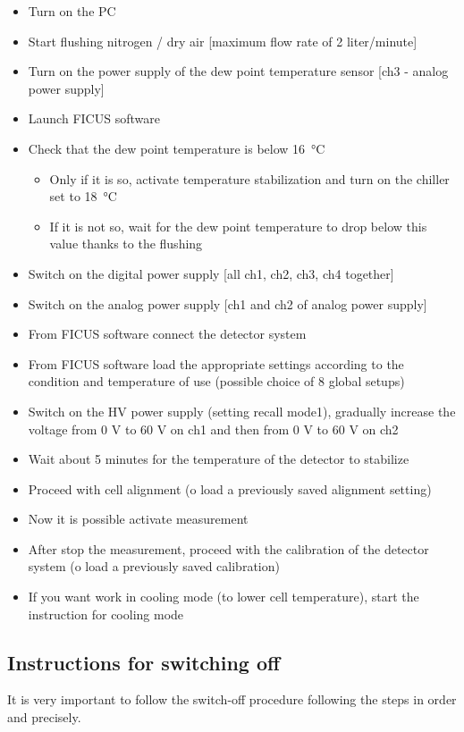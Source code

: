 \documentclass[a4paper,12pt,oneside,pdflatex,italian,final,twocolumn]{article}
\begin{document}
    \begin{itemize}
        \item Turn on the PC
        \item Start flushing nitrogen / dry air [maximum flow rate of 2 liter/minute]
        \item Turn on the power supply of the dew point temperature sensor [ch3 - analog power supply]
        \item Launch FICUS software
        \item Check that the dew point temperature is below \SI{16}{\celsius} 
            \begin{itemize}
                \item Only if it is so, activate temperature stabilization and turn on the chiller set to \SI{18}{\celsius} 
                \item If it is not so, wait for the dew point temperature to drop below this value thanks to the flushing
            \end{itemize}
        \item Switch on the digital power supply [all ch1, ch2, ch3, ch4 together]
        \item Switch on the analog power supply [ch1 and ch2 of analog power supply]
        \item From FICUS software connect the detector system
        \item From FICUS software load the appropriate settings according to the condition and temperature of use (possible choice of 8 global setups)
        \item Switch on the HV power supply (setting recall mode1), gradually increase the voltage from 0 V to 60 V on ch1 and then from 0 V to 60 V on ch2
        \item Wait about 5 minutes for the temperature of the detector to stabilize
        \item Proceed with cell alignment (o load a previously saved alignment setting)
        \item Now it is possible activate measurement
        \item After stop the measurement, proceed with the calibration of the detector system (o load a previously saved calibration)
        \item If you want work in cooling mode (to lower cell temperature), start the instruction for cooling mode
        \end{itemize}

	
    \subsection{Instructions for switching off} \label{spegnimento}
      It is very important to follow the switch-off procedure following the steps in order and precisely.
    
\end{document}
